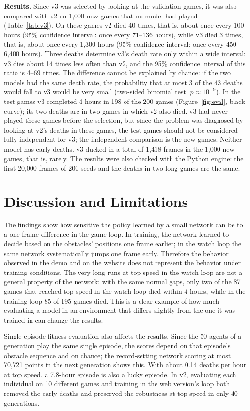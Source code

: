 \documentclass[11pt,a4paper]{article}
\begin{document}
\textbf{Results.} Since v3 was selected by looking at the validation games, it was also compared with v2 on 1,000 new games that no model had played (Table~\ref{tab:v3}). On these games v2 died 40 times, that is, about once every 100 hours (95\% confidence interval: once every 71--136 hours), while v3 died 3 times, that is, about once every 1,300 hours (95\% confidence interval: once every 450--6,400 hours). Three deaths determine v3's death rate only within a wide interval: v3 dies about 14 times less often than v2, and the 95\% confidence interval of this ratio is 4--69 times. The difference cannot be explained by chance: if the two models had the same death rate, the probability that at most 3 of the 43 deaths would fall to v3 would be very small (two-sided binomial test, $p \approx 10^{-9}$). In the test games v3 completed 4 hours in 198 of the 200 games (Figure~\ref{fig:eval}, black curve); its two deaths are in two games in which v2 also died. v3 had never played these games before the selection, but since the problem was diagnosed by looking at v2's deaths in these games, the test games should not be considered fully independent for v3; the independent comparison is the new games. Neither model has early deaths. v3 ducked in a total of 1,418 frames in the 1,000 new games, that is, rarely. The results were also checked with the Python engine: the first 20,000 frames of 200 seeds and the deaths in two long games are the same.

\section{Discussion and Limitations}

The findings show how sensitive the policy learned by a small network can be to a one-frame difference in the game loop. In training, the network learned to decide based on the obstacles' positions one frame earlier; in the watch loop the same network systematically jumps one frame early. Therefore the behavior observed in the demo and on the website does not represent the behavior under training conditions. The very long runs at top speed in the watch loop are not a general property of the network: with the same normal gaps, only two of the 87 games that reached top speed in the watch loop died within 4 hours, while in the training loop 85 of 195 games died. This is a clear example of how much evaluating a model in an environment that differs slightly from the one it was trained in can change the results.

Single-episode fitness evaluation also affects the results. Since the 50 agents of a generation play the same single episode, the scores depend on that episode's obstacle sequence and on chance; the record-setting network scoring at most 70,721 points in the next generation shows this. With about 0.14 deaths per hour at top speed, a 7.8-hour episode is also a lucky episode. In v2, evaluating each individual on 10 different games and training in the web version's loop both removed the early deaths and preserved the robustness at top speed in only 40 generations.
\end{document}
